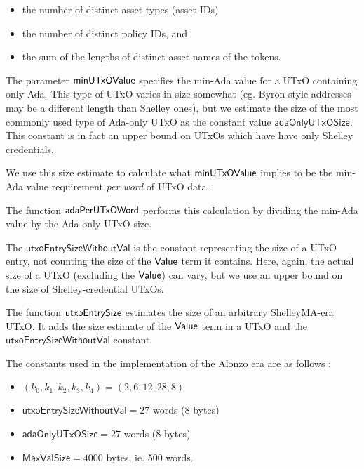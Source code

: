 \begin{itemize}
  \item the number of distinct asset types (asset IDs)
  \item the number of distinct policy IDs, and
  \item the sum of the lengths of distinct asset names of the tokens.
\end{itemize}

The parameter $\mathsf{minUTxOValue}$ specifies the min-Ada value for a UTxO containing
only Ada. This type of UTxO varies in size somewhat (eg. Byron style addresses
may be a different length than Shelley ones), but we estimate the size of the most commonly
used type of Ada-only UTxO as the constant value $\mathsf{adaOnlyUTxOSize}$.
This constant is in fact an upper bound on UTxOs which have have only Shelley credentials.

We use this size estimate
to calculate what $\mathsf{minUTxOValue}$ implies to be the min-Ada value requirement
\emph{per word} of UTxO data.

The function $\mathsf{adaPerUTxOWord}$ performs this calculation by dividing the
min-Ada value by the Ada-only UTxO size.

The $\mathsf{utxoEntrySizeWithoutVal}$ is the constant representing
the size of a UTxO entry, not counting the size of the $\mathsf{Value}$ term it contains.
Here, again, the actual size of a UTxO (excluding the $\mathsf{Value}$) can vary, but
we use an upper bound on the size of Shelley-credential UTxOs.

The function $\mathsf{utxoEntrySize}$ estimates the size of an arbitrary ShelleyMA-era
UTxO. It adds the size estimate of the $\mathsf{Value}$ term in a UTxO and the
$\mathsf{utxoEntrySizeWithoutVal}$ constant.

The constants used in the implementation of the Alonzo era are as follows :

\begin{itemize}
  \item $(k_0, k_1, k_2, k_3, k_4) = (2, 6, 12, 28, 8)$
  \item $\mathsf{utxoEntrySizeWithoutVal} = 27$ words (8 bytes)
  \item $\mathsf{adaOnlyUTxOSize} = 27$ words (8 bytes)
  \item $\mathsf{MaxValSize} = 4000$ bytes, ie. 500 words.
\end{itemize}

